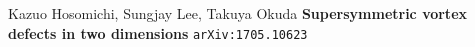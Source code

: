 \documentclass[12pt]{article}
\begin{document}
\vfill

\begin{thebibliography}{}

\item Kazuo Hosomichi, Sungjay Lee, Takuya Okuda \textbf{Supersymmetric vortex defects in two dimensions} \texttt{arXiv:1705.10623}

\end{thebibliography}
\end{document}
